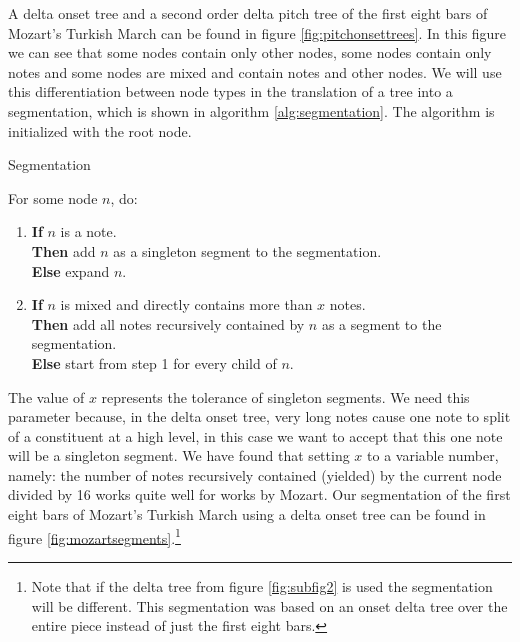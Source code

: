 \documentclass[a4paper,10pt]{article}
\begin{document}
A delta onset tree and a second order delta pitch tree of the first eight bars of Mozart's Turkish March can be found in figure \ref{fig:pitchonsettrees}. In this figure we can see that some nodes contain only other nodes, some nodes contain only notes and some nodes are mixed and contain notes and other nodes. We will use this differentiation between node types in the translation of a tree into a segmentation, which is shown in algorithm \ref{alg:segmentation}. The algorithm is initialized with the root node.
\begin{algorithm}
\caption{Segmentation}
\label{alg:segmentation}
For some node $n$, do:
\begin{enumerate}
\item \textbf{If} $n$ is a note.\\
\textbf{Then} add $n$ as a singleton segment to the segmentation.\\
 \textbf{Else} expand $n$.
\item \textbf{If} $n$ is mixed and directly contains more than $x$ notes.\\
\textbf{Then} add all notes recursively contained by $n$ as a segment to the segmentation.\\
\textbf{Else} start from step 1 for every child of $n$.
\end{enumerate}
\end{algorithm}

The value of $x$ represents the tolerance of singleton segments. We need this parameter because, in the delta onset tree, very long notes cause one note to split of a constituent at a high level, in this case we want to accept that this one note will be a singleton segment. We have found that setting $x$ to a variable number, namely: the number of notes recursively contained (yielded) by the current node divided by 16 works quite well for works by Mozart. Our segmentation of the first eight bars of Mozart's Turkish March using a delta onset tree can be found in figure \ref{fig:mozartsegments}.\footnote{Note that if the delta tree from figure  \ref{fig:subfig2} is used the segmentation will be different. This segmentation was based on an onset delta tree over the entire piece instead of just the first eight bars.}

\end{document}

